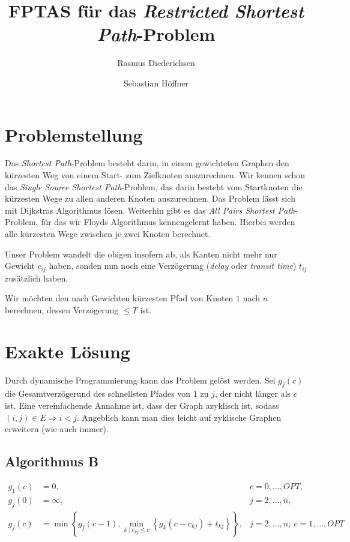 \documentclass{article}
\title{FPTAS für das \emph{Restricted Shortest Path}-Problem}
\author{Rasmus Diederichsen \and Sebastian Höffner}
\begin{document}
\maketitle
\section{Problemstellung}

Das \emph{Shortest Path}-Problem besteht darin, in einem gewichteten Graphen den
kürzesten Weg von einem Start- zum Zielknoten auszurechnen. Wir kennen schon das
\emph{Single Source Shortest Path}-Problem, das darin besteht vom Startknoten
die kürzesten Wege zu allen anderen Knoten auszurechnen. Das Problem lässt sich
mit Dijkstras Algorithmus lösen. Weiterhin gibt es das \emph{All Pairs Shortest
Path}-Problem, für das wir Floyds Algorithmus kennengelernt haben. Hierbei
werden alle kürzesten Wege zwischen je zwei Knoten berechnet.

Unser Problem wandelt die obigen insofern ab, als Kanten nicht mehr nur Gewicht
$c_{ij}$ haben, sonden nun noch eine Verzögerung (\emph{delay} oder
\emph{transit time}) $t_{ij}$ zusätzlich haben.

Wir möchten den nach Gewichten kürzesten Pfad von Knoten $1$ nach $n$ berechnen,
dessen Verzögerung $\le T$ ist.

\section{Exakte Lösung}

Durch dynamische Programmierung kann das Problem gelöst werden.
Sei $g_j(c)$ die Gesamtverzögerund des schnellsten Pfades von $1$ zu $j$, der
nicht länger als $c$ ist. Eine vereinfachende Annahme ist, dass der Graph
azyklisch ist, sodass $(i,j) \in E \Rightarrow i < j$. Angeblich kann man dies
leicht auf zyklische Graphen erweitern (wie auch immer).

\subsection{Algorithmus B}

\begin{center}
   \begin{minipage}{\linewidth}
      \begin{align*}
         g_1(c) & =  0,                                                                                            & c = 0,\ldots,OPT, \\
         g_j(0) & =  \infty,                                                                                       & j = 2,\ldots,n, \\
         g_j(c) & =  \min\left\{g_j(c-1), \min_{k \mid c_{kj} \le
   c}\left\{g_k(c-c_{kj}) + t_{kj}\right\}\right\}, & j = 2,\ldots,n; ~ c= 1,\ldots,OPT
      \end{align*}
   \end{minipage}
\end{center}
\end{document}
